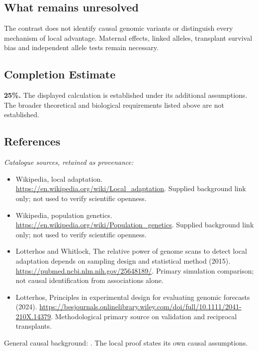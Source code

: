 \documentclass[11pt]{article}
\begin{document}
\subsection{What remains unresolved}
The contrast does not identify causal genomic variants or distinguish every mechanism of local advantage. Maternal effects, linked alleles, transplant survival bias and independent allele tests remain necessary.
\subsection{Completion Estimate}
\textbf{25\%.} The displayed calculation is established under its additional assumptions. The broader theoretical and biological requirements listed above are not established.
\subsection{References}
\noindent\emph{Catalogue sources, retained as provenance:}
\begin{itemize}
\item Wikipedia, local adaptation. \url{https://en.wikipedia.org/wiki/Local_adaptation}. Supplied background link only; not used to verify scientific openness.
\item Wikipedia, population genetics. \url{https://en.wikipedia.org/wiki/Population_genetics}. Supplied background link only; not used to verify scientific openness.
\item Lotterhos and Whitlock, The relative power of genome scans to detect local adaptation depends on sampling design and statistical method (2015). \url{https://pubmed.ncbi.nlm.nih.gov/25648189/}. Primary simulation comparison; not causal identification from associations alone.
\item Lotterhos, Principles in experimental design for evaluating genomic forecasts (2024). \url{https://besjournals.onlinelibrary.wiley.com/doi/full/10.1111/2041-210X.14379}. Methodological primary source on validation and reciprocal transplants.
\end{itemize}
\noindent General causal background: \cite{pearl}. The local proof states its own causal assumptions.
\end{document}
